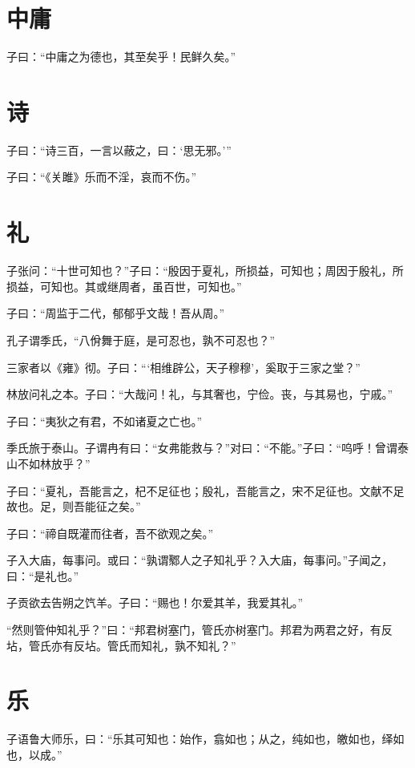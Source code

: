 \documentclass[a5paper]{ctexbook}
\begin{document}
    \chapter{中庸}

    子曰：“中庸之为德也，其至矣乎！民鲜久矣。”

    \chapter{诗}

    子曰：“诗三百，一言以蔽之，曰：‘思无邪。’”

    子曰：“《关雎》乐而不淫，哀而不伤。”

    \chapter{礼}

    子张问：“十世可知也？”子曰：“殷因于夏礼，所损益，可知也；周因于殷礼，所损益，可知也。其或继周者，虽百世，可知也。”

    子曰：“周监于二代，郁郁乎文哉！吾从周。”

    孔子谓季氏，“八佾舞于庭，是可忍也，孰不可忍也？”

    三家者以《雍》彻。子曰：“‘相维辟公，天子穆穆’，奚取于三家之堂？”

    林放问礼之本。子曰：“大哉问！礼，与其奢也，宁俭。丧，与其易也，宁戚。”

    子曰：“夷狄之有君，不如诸夏之亡也。”

    季氏旅于泰山。子谓冉有曰：“女弗能救与？”对曰：“不能。”子曰：“呜呼！曾谓泰山不如林放乎？”

    子曰：“夏礼，吾能言之，杞不足征也；殷礼，吾能言之，宋不足征也。文献不足故也。足，则吾能征之矣。”

    子曰：“禘自既灌而往者，吾不欲观之矣。”

    子入大庙，每事问。或曰：“孰谓鄹人之子知礼乎？入大庙，每事问。”子闻之，曰：“是礼也。”

    子贡欲去告朔之饩羊。子曰：“赐也！尔爱其羊，我爱其礼。”

    “然则管仲知礼乎？”曰：“邦君树塞门，管氏亦树塞门。邦君为两君之好，有反坫，管氏亦有反坫。管氏而知礼，孰不知礼？”

    \chapter{乐}

    子语鲁大师乐，曰：“乐其可知也：始作，翕如也；从之，纯如也，皦如也，绎如也，以成。”
\end{document}

